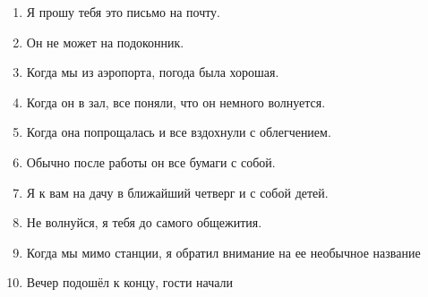 \documentclass[paper=a4, fontsize=11pt]{scrartcl}
\begin{document}
\begin{enumerate}
    \item Я прошу тебя \raisebox{-0.1cm}{\shortstack{\underline{\hspace{3cm}}}} это письмо на почту.
    \item Он не может \raisebox{-0.1cm}{\shortstack{\underline{\hspace{3cm}}}}  на подоконник.
    \item Когда мы \raisebox{-0.1cm}{\shortstack{\underline{\hspace{3cm}}}} из аэропорта, погода была хорошая.
    \item Когда он \raisebox{-0.1cm}{\shortstack{\underline{\hspace{3cm}}}} в зал, все поняли, что он немного волнуется.
    \item Когда она попрощалась и \raisebox{-0.1cm}{\shortstack{\underline{\hspace{3cm}}}} все вздохнули с облегчением.
    \item Обычно после работы он \raisebox{-0.1cm}{\shortstack{\underline{\hspace{3cm}}}}все бумаги с собой.
    \item Я \raisebox{-0.1cm}{\shortstack{\underline{\hspace{3cm}}}} к вам на дачу в ближайший четверг и \raisebox{-0.1cm}{\shortstack{\underline{\hspace{3cm}}}} с собой детей.
    \item Не волнуйся, я   \raisebox{-0.1cm}{\shortstack{\underline{\hspace{3cm}}}}  тебя до самого общежития.
    \item Когда мы \raisebox{-0.1cm}{\shortstack{\underline{\hspace{3cm}}}} мимо станции, я обратил внимание на ее необычное название
    \item Вечер подошёл к концу, гости начали\raisebox{-0.1cm}{\shortstack{\underline{\hspace{3cm}}}}
\end{enumerate}
\end{document}
